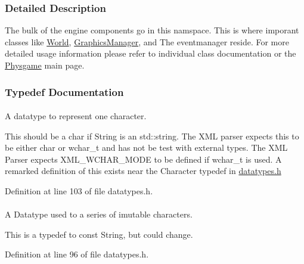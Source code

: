 \subsubsection{Detailed Description}
The bulk of the engine components go in this namspace. This is where imporant classes like \hyperlink{classphys_1_1World}{World}, \hyperlink{classphys_1_1GraphicsManager}{GraphicsManager}, and The eventmanager reside. For more detailed usage information please refer to individual class documentation or the \hyperlink{index}{Physgame} main page. 

\subsubsection{Typedef Documentation}
\hypertarget{namespacephys_a3098bae5b0a3cd16eec331f766cc562b}{
\paragraph[{Character}]{}\hfill}
\label{namespacephys_a3098bae5b0a3cd16eec331f766cc562b}


A datatype to represent one character. 

This should be a char if String is an std::string. The XML parser expects this to be either char or wchar\_\-t and has not be test with external types. The XML Parser expects XML\_\-WCHAR\_\-MODE to be defined if wchar\_\-t is used. A remarked definition of this exists near the Character typedef in \hyperlink{datatypes_8h_source}{datatypes.h} 

Definition at line 103 of file datatypes.h.

\hypertarget{namespacephys_a5ce5049f8b4bf88d6413c47b504ebb31}{
\paragraph[{ConstString}]{}\hfill}
\label{namespacephys_a5ce5049f8b4bf88d6413c47b504ebb31}


A Datatype used to a series of imutable characters. 

This is a typedef to const String, but could change. 

Definition at line 96 of file datatypes.h.

